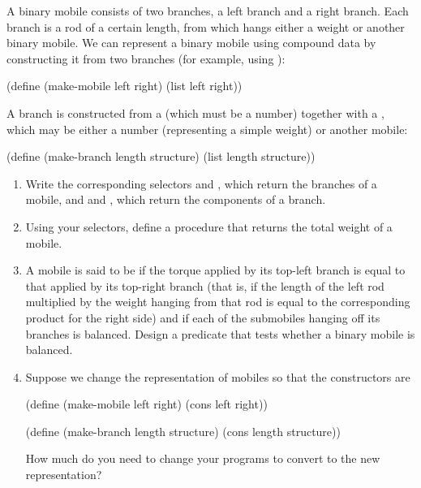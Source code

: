 \begin{exercise}
	\label{Exercise 2.29}
	A binary mobile consists of two branches, a left branch and a right branch.
	Each branch is a rod of a certain length, from which hangs either a weight or another binary mobile.
	We can represent a binary mobile using compound data by constructing it from two branches (for example, using ):
	\begin{scheme}
	  (define (make-mobile left right)
	    (list left right))
	\end{scheme}
	A branch is constructed from a  (which must be a number) together with a , which may be either a number (representing a simple weight) or another mobile:
	\begin{scheme}
	  (define (make-branch length structure)
	    (list length structure))
	\end{scheme}
	\begin{enumerate}[label = \alph*., leftmargin = *]

		\item
			Write the corresponding selectors  and , which return the branches of a mobile, and  and , which return the components of a branch.

		\item
			Using your selectors, define a procedure  that returns the total weight of a mobile.

		\item
			A mobile is said to be  if the torque applied by its top-left branch is equal to that applied by its top-right branch (that is, if the length of the left rod multiplied by the weight hanging from that rod is equal to the corresponding product for the right side) and if each of the submobiles hanging off its branches is balanced.
			Design a predicate that tests whether a binary mobile is balanced.

		\item
			Suppose we change the representation of mobiles so that the constructors are
			\begin{scheme}
			  (define (make-mobile left right) (cons left right))

			  (define (make-branch length structure)
			    (cons length structure))
			\end{scheme}
			How much do you need to change your programs to convert to the new representation?

	\end{enumerate}
\end{exercise}



